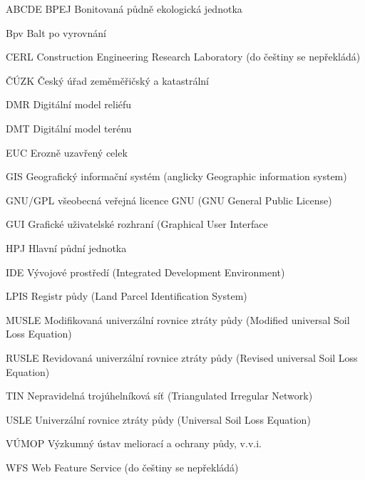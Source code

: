 \begin{seznamzkratek}{ABCDE}
	      {BPEJ}
	      {Bonitovaná půdně ekologická jednotka}

	      {Bpv}
	      {Balt po vyrovnání}
	
	      {CERL}
	      {Construction Engineering Research Laboratory (do češtiny se nepřekládá)}	

	      {ČÚZK}
	      {Český úřad zeměměřičský a katastrální}

	      {DMR}
	      {Digitální model reliéfu}

	      {DMT}
	      {Digitální model terénu}

	      {EUC}
	      {Erozně uzavřený celek}

	      {GIS}
	      {Geografický informační systém (anglicky Geographic information system)}
	      
	      {GNU/GPL}
	      {všeobecná veřejná licence GNU (GNU General Public License)}	
	      
	      {GUI}
	      {Grafické uživatelské rozhraní (Graphical User Interface}		
	      
	      {HPJ}
	      {Hlavní půdní jednotka}
	      
	      {IDE}
	      {Vývojové prostředí (Integrated Development Environment)}	

	      {LPIS}
	      {Registr půdy (Land Parcel Identification System)}

	      {MUSLE}
	      {Modifikovaná univerzální rovnice ztráty půdy (Modified universal Soil Loss Equation)}

	      {RUSLE}
	      {Revidovaná univerzální rovnice ztráty půdy (Revised universal Soil Loss Equation)}

	      {TIN}
	      {Nepravidelná trojúhelníková síť (Triangulated Irregular Network)}

	      {USLE}
	      {Univerzální rovnice ztráty půdy (Universal Soil Loss Equation)}

	      {VÚMOP}
	      {Výzkumný ústav meliorací a ochrany půdy, v.v.i.}
	      
	      {WFS}
	      {Web Feature Service (do češtiny se nepřekládá)}	

\end{seznamzkratek}